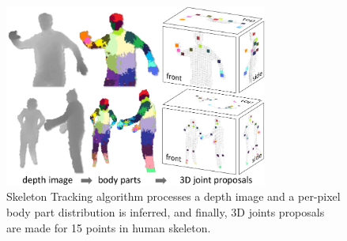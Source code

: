 \begin{figure}
	[h] \centering 
	\includegraphics[height=6cm]{figures/content/ni-alg.jpg} \caption{Skeleton Tracking algorithm processes a depth image and a per-pixel body part distribution is inferred, and finally, 3D joints proposals are made for 15 points in human skeleton. \cite{2} } \label{fg:ni:alg} 
\end{figure}
